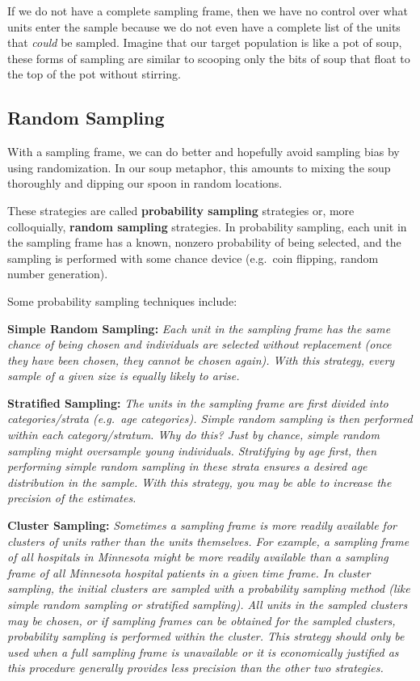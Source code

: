 \documentclass[]{book}
\begin{document}
If we do not have a complete sampling frame, then we have no control over what units enter the sample because we do not even have a complete list of the units that \emph{could} be sampled. Imagine that our target population is like a pot of soup, these forms of sampling are similar to scooping only the bits of soup that float to the top of the pot without stirring.

\hypertarget{random-sampling}{%
\subsection{Random Sampling}\label{random-sampling}}

With a sampling frame, we can do better and hopefully avoid sampling bias by using randomization. In our soup metaphor, this amounts to mixing the soup thoroughly and dipping our spoon in random locations.

These strategies are called \textbf{probability sampling} strategies or, more colloquially, \textbf{random sampling} strategies. In probability sampling, each unit in the sampling frame has a known, nonzero probability of being selected, and the sampling is performed with some chance device (e.g.~coin flipping, random number generation).

Some probability sampling techniques include:

\textbf{Simple Random Sampling:} \emph{Each unit in the sampling frame has the same chance of being chosen and individuals are selected without replacement (once they have been chosen, they cannot be chosen again). With this strategy, every sample of a given size is equally likely to arise.}

\textbf{Stratified Sampling:} \emph{The units in the sampling frame are first divided into categories/strata (e.g.~age categories). Simple random sampling is then performed within each category/stratum. Why do this? Just by chance, simple random sampling might oversample young individuals. Stratifying by age first, then performing simple random sampling in these strata ensures a desired age distribution in the sample. With this strategy, you may be able to increase the precision of the estimates.}

\textbf{Cluster Sampling:} \emph{Sometimes a sampling frame is more readily available for clusters of units rather than the units themselves. For example, a sampling frame of all hospitals in Minnesota might be more readily available than a sampling frame of all Minnesota hospital patients in a given time frame. In cluster sampling, the initial clusters are sampled with a probability sampling method (like simple random sampling or stratified sampling). All units in the sampled clusters may be chosen, or if sampling frames can be obtained for the sampled clusters, probability sampling is performed within the cluster. This strategy should only be used when a full sampling frame is unavailable or it is economically justified as this procedure generally provides less precision than the other two strategies.}
\end{document}
